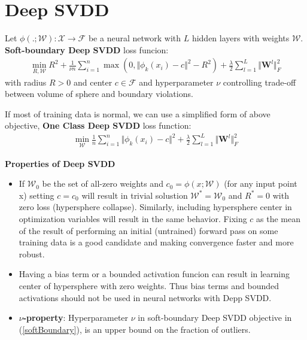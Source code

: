 \documentclass[a4]{article}
\begin{document}
\section{Deep SVDD}
Let $ \phi(.;\mathcal{W}) : \mathcal{X} \rightarrow \mathcal{F} $ be a neural network with $ L $ hidden layers with weights $ \mathcal{W} $.
\textbf{Soft-boundary Deep SVDD} loss funcion:
\begin{equation}
\begin{split}
\min_{R, \mathcal{W}} R^2 + \frac{1}{\nu n}\sum_{i=1}^{n} \max(0, \Vert\phi_k(x_i) - c\Vert ^2 - R^2) + \frac{\lambda}{2}\sum_{l=1}^{L}\Vert \mathbf{W}^l\Vert^2_F
\end{split}
\label{softBoundary}
\end{equation}
with radius $ R > 0 $ and center $ c \in \mathcal{F} $ and hyperparameter $ \nu $ controlling trade-off between volume of sphere and boundary violations.

If most of training data is normal, we can use a simplified form of above objective, \textbf{One Class Deep SVDD} loss function:
\begin{equation}
	\begin{split}
		\min_{\mathcal{W}} \frac{1}{n}\sum_{i=1}^{n} \Vert\phi_k(x_i) - c\Vert ^2 + \frac{\lambda}{2}\sum_{l=1}^{L}\Vert \mathbf{W}^l\Vert^2_F
	\end{split}
\end{equation}

\noindent
\textbf{Properties of Deep SVDD}\\
\begin{itemize}
\item 
If $ \mathcal{W}_0 $ be the set of all-zero weights and $ c_0 = \phi(x;\mathcal{W}) $ (for any input point x) setting $ c = c_0 $ will result in trivial solustion $ \mathcal{W}^* = \mathcal{W}_0$ and $ R^* = 0 $ with zero loss (hypersphere collapse). Similarly, including hypersphere center in optimization variables will result in the same behavior. Fixing $ c $ as the mean of the result of performing an initial (untrained) forward pass on some training data is a good candidate and making convergence faster and more robust.
\item Having a bias term or a bounded activation funcion can result in learning center of hypersphere with zero weights. Thus bias terms and bounded activations should not be used in neural networks with Depp SVDD.

\item \textbf{$ \nu $-property}: Hyperparameter $ \nu $ in soft-boundary Deep SVDD objective in (\ref{softBoundary}), is an upper bound on the fraction of outliers.
\end{itemize}
\end{document}
